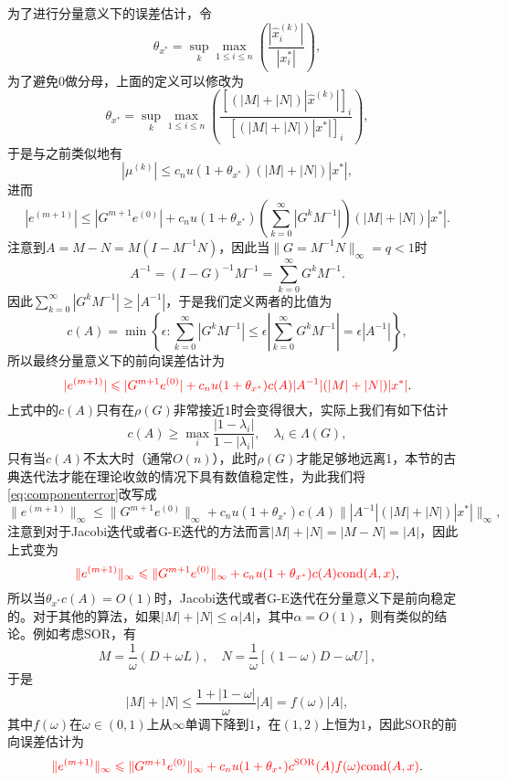 \documentclass[a4paper,10pt]{ctexart}
\begin{document}
为了进行分量意义下的误差估计，令
\[
    \theta_{x^*} = \sup_k \max_{1\leqslant i\leqslant n}\left( \frac{|\hat{x}^{(k)}_i|}{|x^*_i|} \right),
\]
为了避免$ 0 $做分母，上面的定义可以修改为
\[
    \theta_{x^*} = \sup_k \max_{1\leqslant i\leqslant n}\left( \frac{ [(|M|+|N|)|\hat{x}^{(k)}|]_i}{[(|M|+|N|)|x^*|]_i} \right),
\]
于是与之前类似地有
\[
    |\mu^{(k)}| \leqslant c_n u(1+\theta_{x^*})(|M|+|N|)|x^*|,
\]
进而
\[
    |e^{(m+1)}|\leqslant |G^{m+1} e^{(0)}| + c_n u(1+\theta_{x^*}) \left( \sum_{k=0}^\infty |G^kM^{-1}| \right)  (|M|+|N|)|x^*|.
\]
注意到$ A = M-N = M(I-M^{-1}N) $，因此当$ \| G=M^{-1}N \|_\infty = q<1 $时
\[
    A^{-1} = (I-G)^{-1}M^{-1} = \sum_{k=0}^\infty G^k M^{-1}.
\]
因此$ \sum_{k=0}^\infty |G^kM^{-1}| \geqslant |A^{-1}| $，于是我们定义两者的比值为
\[
    c(A) = \min\left\{ \epsilon:\sum_{k=0}^\infty |G^kM^{-1}| \leqslant \epsilon \left\vert \sum_{k=0}^\infty G^kM^{-1} \right\vert = \epsilon|A^{-1}| \right\} ,
\]
所以最终分量意义下的前向误差估计为
\begin{equation}\label{eq:componenterror}
    \textcolor{red}{|e^{(m+1)}|\leqslant |G^{m+1} e^{(0)}| + c_n u(1+\theta_{x^*}) c(A)|A^{-1}|  (|M|+|N|)|x^*|}.
\end{equation}
上式中的$ c(A) $只有在$ \rho(G) $非常接近$ 1 $时会变得很大，实际上我们有如下估计
\[
    c(A) \geqslant \max_i \frac{|1-\lambda_i|}{1-|\lambda_i|},\quad \lambda_i\in \Lambda(G),
\]
只有当$ c(A) $不太大时（通常$ O(n) $），此时$ \rho(G) $才能足够地远离1，本节的古典迭代法才能在理论收敛的情况下具有数值稳定性，为此我们将\eqref{eq:componenterror}改写成
\begin{equation}
    \|e^{(m+1)}\|_\infty \leqslant \|G^{m+1} e^{(0)}\|_\infty + c_n u(1+\theta_{x^*}) c(A)\| |A^{-1}|  (|M|+|N|)|x^*| \|_\infty,
\end{equation}
注意到对于Jacobi迭代或者G-E迭代的方法而言$ |M|+|N| = |M-N| = |A| $，因此上式变为
\[
    \textcolor{red}{\|e^{(m+1)}\|_\infty \leqslant \|G^{m+1} e^{(0)}\|_\infty + c_n u(1+\theta_{x^*}) c(A) {\rm cond}(A,x)},
\]
所以当$ \theta_{x^*}c(A) = O(1) $时，Jacobi迭代或者G-E迭代在分量意义下是前向稳定的。对于其他的算法，如果$ |M|+|N|\leqslant \alpha |A| $，其中$ \alpha=O(1) $，则有类似的结论。例如考虑SOR，有
\[
    M = \frac{1}{\omega}(D+\omega L), \quad N = \frac{1}{\omega}[(1-\omega)D - \omega U],
\]
于是
\[
    |M|+|N|\leqslant \frac{1+|1-\omega|}{\omega}|A| = f(\omega)|A|,
\]
其中$ f(\omega) $在$ \omega\in(0,1) $上从$ \infty $单调下降到$ 1 $，在$ (1,2) $上恒为$ 1 $，因此SOR的前向误差估计为
\[
    \textcolor{red}{\|e^{(m+1)}\|_\infty \leqslant \|G^{m+1} e^{(0)}\|_\infty + c_n u(1+\theta_{x^*}) c^{\rm SOR}(A)f(\omega) {\rm cond}(A,x)}.
\]
\end{document}
